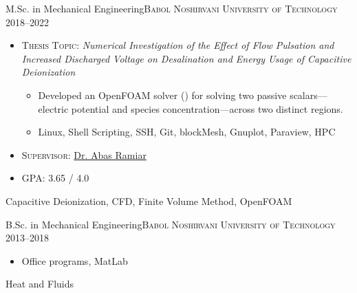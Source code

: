 \begin{experiences}
  \experience
  {}   {M.Sc. in Mechanical Engineering}{\normalfont\textsc{Babol Noshirvani University of Technology}}{}
  {2018--2022} {
    \begin{itemize}
      \item \textsc{Thesis Topic}: {\emph{Numerical Investigation of the Effect of Flow Pulsation and Increased Discharged Voltage on Desalination and Energy Usage of Capacitive Deionization}}
        \begin{itemize}
          \item Developed an OpenFOAM solver () for solving two passive scalars---electric potential and species concentration---across two distinct regions.
          \item Linux, Shell Scripting, SSH, Git, blockMesh, Gnuplot, Paraview, HPC
        \end{itemize}
      \item \textsc{Supervisor}: {\hyperref[recom:ramiar]{\color{linkcolor}Dr. Abas Ramiar}}
      \item \textsc{GPA}: 3.65 / 4.0
        \vspace{3pt}
    \end{itemize}
  }
  {Capacitive Deionization, CFD, Finite Volume Method, OpenFOAM}
\end{experiences}

\begin{experiences}
  \experience
  {}   {B.Sc. in Mechanical Engineering}{\normalfont\textsc{Babol Noshirvani University of Technology}}{}
  {2013--2018} {
    \begin{itemize}
      \item Office programs, MatLab
    \end{itemize}
  }
  {Heat and Fluids}
\end{experiences}

  \shorthandon{:}
\vspace{2pt}
